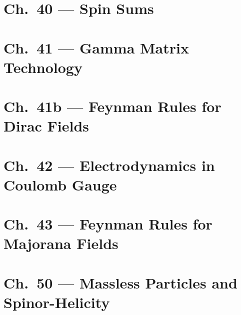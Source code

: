 \documentclass[12pt]{report}
\theoremstyle{remark}
\begin{document}
\chapter{Ch.\ 40 --- Spin Sums}


\chapter{Ch.\ 41 --- Gamma Matrix Technology}


\chapter{Ch.\ 41b --- Feynman Rules for Dirac Fields}


\chapter{Ch.\ 42 --- Electrodynamics in Coulomb Gauge}


\chapter{Ch.\ 43 --- Feynman Rules for Majorana Fields}


\chapter{Ch.\ 50 --- Massless Particles and Spinor-Helicity}

\end{document}
